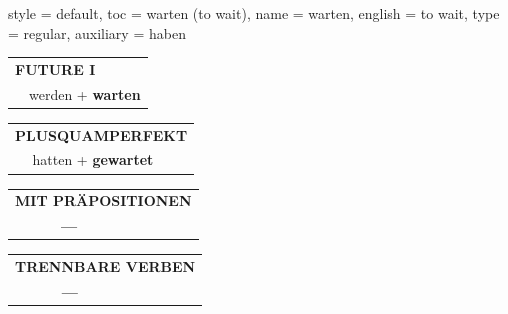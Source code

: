 \begin{verbentry}{
  style = {default},
  toc = {warten (to wait)},
  name = {warten},
  english = {to wait},
  type = {regular},
  auxiliary = {haben}
}
\begin{tabular}{rl}
    \multicolumn{2}{l}{\textbf{FUTURE I} }\\
  &  werden + \textbf{warten}\\
 
  \end{tabular}
\hfill
   \begin{tabular}{rl}
      \multicolumn{2}{l}{\textbf{PLUSQUAMPERFEKT}}\\
  &  hatten + \textbf{gewartet}\\
  \end{tabular}
  
  \vspace{10pt}



\begin{tabular}{lll}
\multicolumn{3}{l}{\textbf{MIT PRÄPOSITIONEN}}\\
& \textbf{---} & \\
\end{tabular}
\hfill
\begin{tabular}{lll}
\multicolumn{3}{l}{\textbf{TRENNBARE VERBEN}}\\
& \textbf{---} & \\
\end{tabular}

  \vspace{-5pt}
\end{verbentry}

